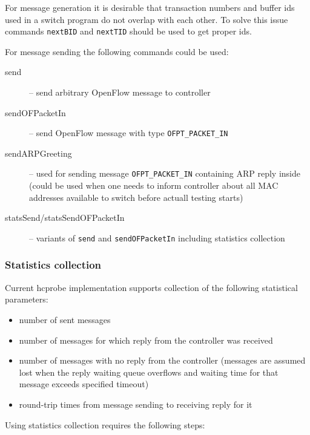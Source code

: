 \documentclass[9pt,a4paper]{article}
\begin{document}
For message generation it is desirable that transaction numbers and
buffer ids used in a switch program do not overlap with each
other. To solve this issue commands \lstinline!nextBID! and
\lstinline!nextTID! should be used to get proper ids.

For message sending the following commands could be used:

\begin{description}

  \item[send] -- send arbitrary OpenFlow message to controller

  \item[sendOFPacketIn] -- send OpenFlow message with type
    \lstinline!OFPT_PACKET_IN!

  \item[sendARPGreeting] -- used for sending message
    \lstinline!OFPT_PACKET_IN!  containing ARP reply inside (could be
    used when one needs to inform controller about all MAC
    addresses available to switch before actuall testing starts)

  \item[statsSend/statsSendOFPacketIn] -- variants of \lstinline!send!
    and \lstinline!sendOFPacketIn! including statistics collection

\end{description}

\subsubsection{Statistics collection}

Current hcprobe implementation supports collection of the following
statistical parameters:

\begin{itemize}
  \item number of sent messages
  \item number of messages for which reply from the controller was
    received
  \item number of messages with no reply from the controller (messages
    are assumed lost when the reply waiting queue overflows and
    waiting time for that message exceeds specified timeout)
  \item round-trip times from message sending to receiving reply for it
\end{itemize}

Using statistics collection requires the following steps:
\end{document}
